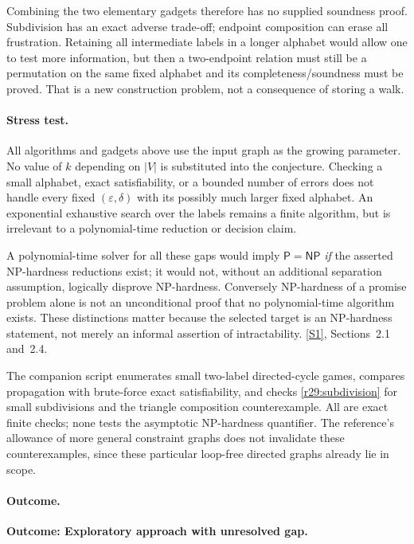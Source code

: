 \documentclass[11pt,a4paper]{article}
\newcommand{\sref}[2]{\hyperlink{source:#1:#2}{[S#2]}}
\numberwithin{equation}{section}
\begin{document}
Combining the two elementary gadgets therefore has no supplied
soundness proof. Subdivision has an exact adverse trade-off; endpoint
composition can erase all frustration. Retaining all intermediate labels
in a longer alphabet would allow one to test more information, but then
a two-endpoint relation must still be a permutation on the same fixed
alphabet and its completeness/soundness must be proved. That is a new
construction problem, not a consequence of storing a walk.

\paragraph{Stress test.}
All algorithms and gadgets above use the input graph as the growing
parameter. No value of $k$ depending on $|V|$ is substituted into the
conjecture. Checking a small alphabet, exact satisfiability, or a bounded
number of errors does not handle every fixed $(\varepsilon,\delta)$
with its possibly much larger fixed alphabet. An exponential exhaustive
search over the labels remains a finite algorithm, but is irrelevant to
a polynomial-time reduction or decision claim.

A polynomial-time solver for all these gaps would imply $\mathsf P=\mathsf{NP}$
\emph{if} the asserted NP-hardness reductions exist; it would not, without
an additional separation assumption, logically disprove NP-hardness.
Conversely NP-hardness of a promise problem alone is not an unconditional
proof that no polynomial-time algorithm exists. These distinctions matter
because the selected target is an NP-hardness statement, not merely an
informal assertion of intractability. \sref{29}{1}, Sections~2.1 and~2.4.

The companion script enumerates small two-label directed-cycle games,
compares propagation with brute-force exact satisfiability, and checks
\eqref{r29:subdivision} for small subdivisions and the triangle
composition counterexample. All are exact finite checks; none tests the
asymptotic NP-hardness quantifier. The reference's allowance of more
general constraint graphs does not invalidate these counterexamples,
since these particular loop-free directed graphs already lie in scope.

\paragraph{Outcome.}
\textbf{Outcome: Exploratory approach with unresolved gap.}
\end{document}

